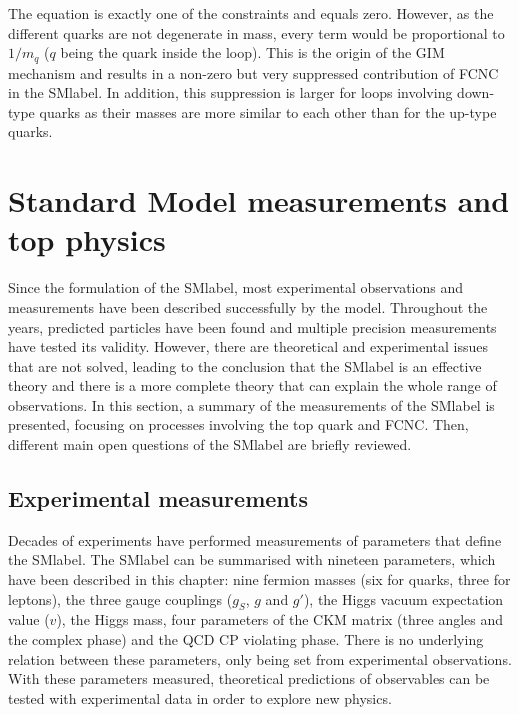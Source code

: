 The equation is exactly one of the constraints and equals zero.  However, as the different quarks are not degenerate in mass, every term would be proportional to $1/m_q$ ($q$ being the quark inside the loop). This is the origin of the GIM mechanism and results in a non-zero but very suppressed contribution of FCNC in the \acrshort{SMlabel}. In addition, this suppression is larger for loops involving down-type quarks as their masses are more similar to each other than for the up-type quarks.

\section{Standard Model measurements and top physics}

Since the formulation of the \acrshort{SMlabel}, most experimental observations and measurements have been described successfully by the model. Throughout the years, predicted particles have been found and multiple precision measurements have tested its validity. However, there are theoretical and experimental issues that are not solved, leading to the conclusion that the \acrshort{SMlabel} is an effective theory and there is a more complete theory that can explain the whole range of observations. In this section, a summary of the measurements of the \acrshort{SMlabel} is presented, focusing on processes involving the top quark and FCNC. Then, different main open questions of the \acrshort{SMlabel} are briefly reviewed.

\subsection{Experimental measurements}

Decades of experiments have performed measurements of parameters that define the \acrshort{SMlabel}. The \acrshort{SMlabel} can be summarised with nineteen parameters, which have been described in this chapter: nine fermion masses (six for quarks, three for leptons), the three gauge couplings ($g_S$, $g$ and $g'$), the Higgs vacuum expectation value ($v$), the Higgs mass, four parameters of the CKM matrix (three angles and the complex phase) and the \acrshort{QCD} CP violating phase. There is no underlying relation between these parameters, only being set from experimental observations. With these parameters measured, theoretical predictions of observables can be tested with experimental data in order to explore new physics.\\

